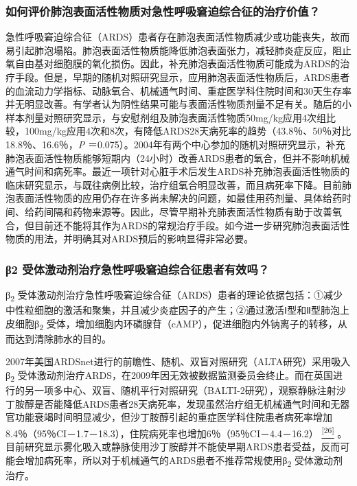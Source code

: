\subsubsection{如何评价肺泡表面活性物质对急性呼吸窘迫综合征的治疗价值？}

急性呼吸窘迫综合征（ARDS）患者存在肺泡表面活性物质减少或功能丧失，故而易引起肺泡塌陷。肺泡表面活性物质能降低肺泡表面张力，减轻肺炎症反应，阻止氧自由基对细胞膜的氧化损伤。因此，补充肺泡表面活性物质可能成为ARDS的治疗手段。但是，早期的随机对照研究显示，应用肺泡表面活性物质后，ARDS患者的血流动力学指标、动脉氧合、机械通气时间、重症医学科住院时间和30天生存率并无明显改善。有学者认为阴性结果可能与表面活性物质剂量不足有关。随后的小样本剂量对照研究显示，与安慰剂组及肺泡表面活性物质50mg/kg应用4次组比较，100mg/kg应用4次和8次，有降低ARDS28天病死率的趋势（43.8％、50％对比18.8％、16.6％，\emph{P}
＝0.075）。2004年有两个中心参加的随机对照研究显示，补充肺泡表面活性物质能够短期内（24小时）改善ARDS患者的氧合，但并不影响机械通气时间和病死率。最近一项针对心脏手术后发生ARDS补充肺泡表面活性物质的临床研究显示，与既往病例比较，治疗组氧合明显改善，而且病死率下降。目前肺泡表面活性物质的应用仍存在许多尚未解决的问题，如最佳用药剂量、具体给药时间、给药间隔和药物来源等。因此，尽管早期补充肺表面活性物质有助于改善氧合，但目前还不能将其作为ARDS的常规治疗手段。如今进一步研究肺泡表面活性物质的用法，并明确其对ARDS预后的影响显得非常必要。

\subsubsection{β2 受体激动剂治疗急性呼吸窘迫综合征患者有效吗？}

β\textsubscript{2}
受体激动剂治疗急性呼吸窘迫综合征（ARDS）患者的理论依据包括：①减少中性粒细胞的激活和聚集，并且减少炎症因子的产生；②通过激活Ⅰ型和Ⅱ型肺泡上皮细胞β\textsubscript{2}
受体，增加细胞内环磷腺苷（cAMP），促进细胞内外钠离子的转移，从而达到清除肺水的目的。

2007年美国ARDSnet进行的前瞻性、随机、双盲对照研究（ALTA研究）采用吸入β\textsubscript{2}
受体激动剂治疗ARDS，在2009年因无效被数据监测委员会终止。而在英国进行的另一项多中心、双盲、随机平行对照研究（BALTI-2研究），观察静脉注射沙丁胺醇是否能降低ARDS患者28天病死率，发现虽然治疗组无机械通气时间和无器官功能衰竭时间明显减少，但沙丁胺醇引起的重症医学科住院患者病死率增加8.4％（95％CI－1.7－18.3），住院病死率也增加6％（95％CI－4.4－16.2）
\protect\hyperlink{text00011.htmlux5cux23ch26-10}{\textsuperscript{{[}26{]}}}
。目前研究显示雾化吸入或静脉使用沙丁胺醇并不能使早期ARDS患者受益，反而可能会增加病死率，所以对于机械通气的ARDS患者不推荐常规使用β\textsubscript{2}
受体激动剂治疗。

